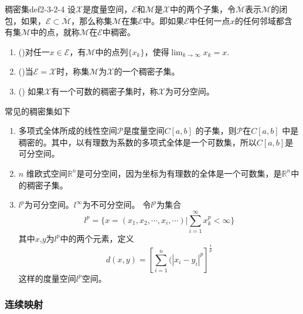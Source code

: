 	\begin{definition}{稠密集}{def2-3-2-4}
		设$\mathcal{X}$是度量空间，$\mathcal{E}$和$\mathcal{M}$是$\mathcal{X}$中的两个子集，令$\overline{\mathcal{M}}$表示$\mathcal{M}$的闭包，如果，$\mathcal{E} \subset \overline{\mathcal{M}}$，那么称集$\mathcal{M}$在集$\mathcal{E}$中。即如果$\mathcal{E}$中任何一点$x$的任何邻域都含有集$\mathcal{M}$中的点，就称$\mathcal{M}$在$\mathcal{E}$中稠密。
	\end{definition}


	\begin{note}
		\begin{enumerate}
			\item ()对任一$x \in \mathcal{E}$，有$\mathcal{M}$中的点列$\{x_k\}$，使得$\displaystyle \lim _{k \rightarrow \infty} x_{k}=x$.
			\item ()当$\mathcal{E}=\mathcal{X}$时，称集$\mathcal{M}$为$\mathcal{X}$的一个稠密子集。
			\item () 如果$\mathcal{X}$有一个可数的稠密子集时，称$\mathcal{X}$为可分空间。
		\end{enumerate}
	\end{note}

	\begin{example}
		常见的稠密集如下
		\begin{enumerate}
			\item 多项式全体所成的线性空间$\mathcal{P}$是度量空间$C[a,b]$ 的子集，则$\mathcal{P}$在$C[a,b]$ 中是稠密的。其中，以有理数为系数的多项式全体是一个可数集，所以$C[a,b]$是可分空间。
			\item $n$ 维欧式空间$\mathbb{R}^n$是可分空间，因为坐标为有理数的全体是一个可数集，是$\mathbb{R}^n$中的稠密子集。
			\item $l^p$为可分空间。$l^\infty$为不可分空间。
			令$l^p$为集合
			$$\displaystyle l^p =\{ x = (x_1,x_2,\cdots,x_i,\cdots ) |\sum_{i=1}^{\infty}x^p_k < \infty \}$$
			其中$x$,$y$为$l^p$中的两个元素，定义
			\begin{equation}
			d(x,y) = [\sum_{i=1}^{n}(|x_i-y_i|^p]^{\frac{1}{p}}
			\end{equation}
			这样的度量空间$l^p$空间。
		\end{enumerate}
	\end{example}

\subsubsection{连续映射}

